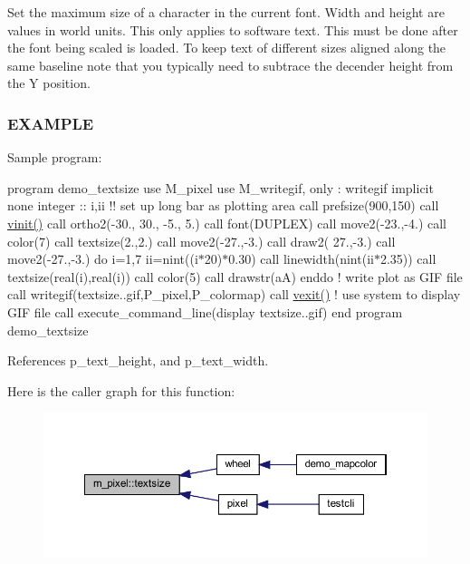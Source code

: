 \begin{DoxyVerb}Set the maximum size of a character in the current font. Width and height
are values in world units. This only applies to software text. This must
be done after the font being scaled is loaded. To keep text of different
sizes aligned along the same baseline note that you typically need to
subtrace the decender height from the Y position.
\end{DoxyVerb}


\subsubsection*{E\+X\+A\+M\+P\+LE}

Sample program\+:

program demo\+\_\+textsize use M\+\_\+pixel use M\+\_\+writegif, only \+: writegif implicit none integer \+:\+: i,ii !! set up long bar as plotting area call prefsize(900,150) call \hyperlink{namespacem__pixel_ac03ca8f23fdadb60599b6ea4dc87a6d9}{vinit()} call ortho2(-\/30., 30., -\/5., 5.) call font(\textquotesingle{}D\+U\+P\+L\+EX\textquotesingle{}) call move2(-\/23.,-\/4.) call color(7) call textsize(2.,2.) call move2(-\/27.,-\/3.) call draw2( 27.,-\/3.) call move2(-\/27.,-\/3.) do i=1,7 ii=nint((i$\ast$20)$\ast$0.30) call linewidth(nint(ii$\ast$2.35)) call textsize(real(i),real(i)) call color(5) call drawstr(\textquotesingle{}aA\textquotesingle{}) enddo ! write plot as G\+IF file call writegif(\textquotesingle{}textsize..\+gif\textquotesingle{},P\+\_\+pixel,P\+\_\+colormap) call \hyperlink{namespacem__pixel_a19ad6b65752322b0029a62cc0ebec3e8}{vexit()} ! use system to display G\+IF file call execute\+\_\+command\+\_\+line(\textquotesingle{}display textsize..\+gif\textquotesingle{}) end program demo\+\_\+textsize 

References p\+\_\+text\+\_\+height, and p\+\_\+text\+\_\+width.

Here is the caller graph for this function\+:
\nopagebreak
\begin{figure}[H]
\begin{center}
\leavevmode
\includegraphics[width=350pt]{namespacem__pixel_a070e9fff1f2cd0c89d40c5d3c72b7f2c_icgraph}
\end{center}
\end{figure}
\mbox{\label{namespacem__pixel_a19ad6b65752322b0029a62cc0ebec3e8}} 
